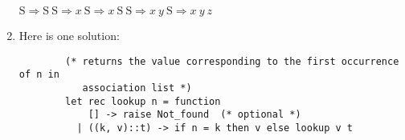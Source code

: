 \documentclass[11pt]{article}
\begin{document}
\begin{enumerate}
                  \smallskip

                  \(
                    \mathrm{S} \Longrightarrow \mathrm{S \ S}
                    \Longrightarrow x \ \mathrm{S} \Longrightarrow x \
                    \mathrm{S \ S} \Longrightarrow x \ y \ \mathrm{S}
                    \Longrightarrow x \ y \ z
                  \)


          \pagebreak

    \item Here is one solution:

          \begin{Verbatim}
        (* returns the value corresponding to the first occurrence of n in
           association list *)
        let rec lookup n = function
            [] -> raise Not_found  (* optional *)
          | ((k, v)::t) -> if n = k then v else lookup v t


\end{Verbatim}
\end{enumerate}
\end{document}
